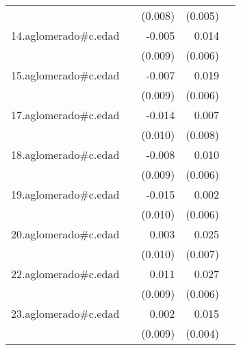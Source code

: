 {\begin{longtable}{l*{4}{D{.}{.}{-1}}}
            &                     &     (0.008)         &     (0.005)         &                     \\
\addlinespace
14.aglomerado#c.edad&                     &      -0.005         &       0.014\sym{*}  &                     \\
            &                     &     (0.009)         &     (0.006)         &                     \\
\addlinespace
15.aglomerado#c.edad&                     &      -0.007         &       0.019\sym{**} &                     \\
            &                     &     (0.009)         &     (0.006)         &                     \\
\addlinespace
17.aglomerado#c.edad&                     &      -0.014         &       0.007         &                     \\
            &                     &     (0.010)         &     (0.008)         &                     \\
\addlinespace
18.aglomerado#c.edad&                     &      -0.008         &       0.010         &                     \\
            &                     &     (0.009)         &     (0.006)         &                     \\
\addlinespace
19.aglomerado#c.edad&                     &      -0.015         &       0.002         &                     \\
            &                     &     (0.010)         &     (0.006)         &                     \\
\addlinespace
20.aglomerado#c.edad&                     &       0.003         &       0.025\sym{***}&                     \\
            &                     &     (0.010)         &     (0.007)         &                     \\
\addlinespace
22.aglomerado#c.edad&                     &       0.011         &       0.027\sym{***}&                     \\
            &                     &     (0.009)         &     (0.006)         &                     \\
\addlinespace
23.aglomerado#c.edad&                     &       0.002         &       0.015\sym{***}&                     \\
            &                     &     (0.009)         &     (0.004)         &                     \\

\end{longtable}}
